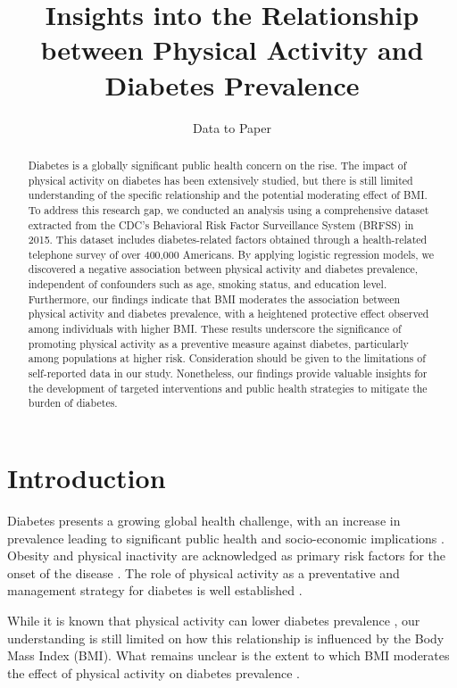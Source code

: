 \documentclass[11pt]{article}
\title{Insights into the Relationship between Physical Activity and Diabetes Prevalence}
\author{Data to Paper}
\begin{document}
\maketitle
\begin{abstract}Diabetes is a globally significant public health concern on the rise. The impact of physical activity on diabetes has been extensively studied, but there is still limited understanding of the specific relationship and the potential moderating effect of BMI. To address this research gap, we conducted an analysis using a comprehensive dataset extracted from the CDC's Behavioral Risk Factor Surveillance System (BRFSS) in 2015. This dataset includes diabetes-related factors obtained through a health-related telephone survey of over 400,000 Americans. By applying logistic regression models, we discovered a negative association between physical activity and diabetes prevalence, independent of confounders such as age, smoking status, and education level. Furthermore, our findings indicate that BMI moderates the association between physical activity and diabetes prevalence, with a heightened protective effect observed among individuals with higher BMI. These results underscore the significance of promoting physical activity as a preventive measure against diabetes, particularly among populations at higher risk. Consideration should be given to the limitations of self-reported data in our study. Nonetheless, our findings provide valuable insights for the development of targeted interventions and public health strategies to mitigate the burden of diabetes.\end{abstract}
\section*{Introduction}

Diabetes presents a growing global health challenge, with an increase in prevalence leading to significant public health and socio-economic implications \cite{Akter2014PrevalenceOD, Lam2012TheWD}. Obesity and physical inactivity are acknowledged as primary risk factors for the onset of the disease \cite{Chan1994ObesityFD, Wild2006RiskFF, Singh2013TheAQ}. The role of physical activity as a preventative and management strategy for diabetes is well established \cite{Fox1999TheIO, Bohn2015ImpactOP, Eckert2012ImpactOP}.

While it is known that physical activity can lower diabetes prevalence \cite{Zhao2020PhysicalAL, Shi2013PhysicalAS}, our understanding is still limited on how this relationship is influenced by the Body Mass Index (BMI). What remains unclear is the extent to which BMI moderates the effect of physical activity on diabetes prevalence \cite{Bohn2015ImpactOP, Pi-Sunyer2007ReductionIW}. 
\end{document}
